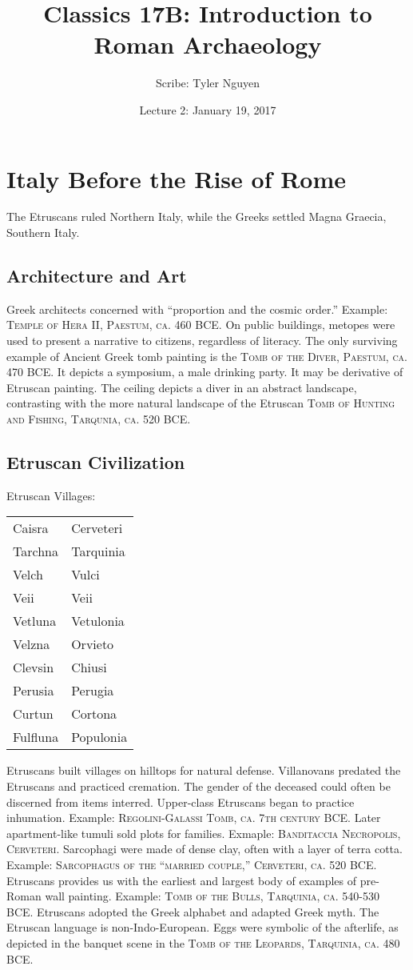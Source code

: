 \documentclass{article}
\begin{document}
\title{Classics 17B: Introduction to Roman Archaeology}
\author{Scribe: Tyler Nguyen}
\date{Lecture 2: January 19, 2017}
\maketitle
\section{Italy Before the Rise of Rome}
The Etruscans ruled Northern Italy, while the Greeks settled Magna Graecia, Southern Italy.
\subsection{Architecture and Art}
Greek architects concerned with ``proportion and the cosmic order.'' Example: \textsc{Temple of Hera II, Paestum, ca. 460 BCE}.  On public buildings, metopes were used to present a narrative to citizens, regardless of literacy. The only surviving example of Ancient Greek tomb painting is the \textsc{Tomb of the Diver, Paestum, ca. 470 BCE}.  It depicts a symposium, a male drinking party. It may be derivative of Etruscan painting.  The ceiling depicts a diver in an abstract landscape, contrasting with the more natural landscape of the Etruscan \textsc{Tomb of Hunting and Fishing, Tarqunia, ca. 520 BCE}.
\subsection{Etruscan Civilization}
Etruscan Villages:\\
\begin{tabular}{ll}
Caisra & Cerveteri\\
Tarchna & Tarquinia\\
Velch & Vulci\\
Veii & Veii\\
Vetluna & Vetulonia\\
Velzna & Orvieto\\
Clevsin & Chiusi\\
Perusia & Perugia\\
Curtun & Cortona\\
Fulfluna & Populonia\\
\end{tabular}

Etruscans built villages on hilltops for natural defense. Villanovans predated the Etruscans and practiced cremation. The gender of the deceased could often be discerned from items interred. Upper-class Etruscans began to practice inhumation. Example: \textsc{Regolini-Galassi Tomb, ca. 7th century BCE}. Later apartment-like tumuli sold plots for families. Exmaple: \textsc{Banditaccia Necropolis, Cerveteri}. Sarcophagi were made of dense clay, often with a layer of terra cotta. Example: \textsc{Sarcophagus of the ``married couple,'' Cerveteri, ca. 520 BCE}.  Etruscans provides us with the earliest and largest body of examples of pre-Roman wall painting. Example: \textsc{Tomb of the Bulls, Tarquinia, ca. 540-530 BCE}. Etruscans adopted the Greek alphabet and adapted Greek myth.  The Etruscan language is non-Indo-European. Eggs were symbolic of the afterlife, as depicted in the banquet scene in the \textsc{Tomb of the Leopards, Tarquinia, ca. 480 BCE}.
\end{document}
